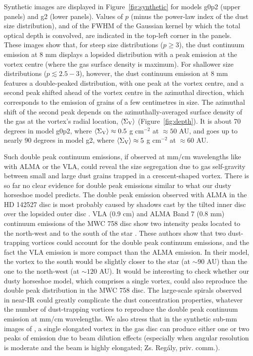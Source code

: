 \documentclass[a4paper,usenatbib]{mnras}
\begin{document}
Synthetic images are displayed in Figure~\ref{fig:synthetic} for
models g0p2 (upper panels) and g2 (lower panels). Values of $p$ (minus
the power-law index of the dust size distribution), and of the FWHM of
the Gaussian kernel by which the total optical depth is convolved, are
indicated in the top-left corner in the panels. These images show
that, for steep size distributions ($p \geq 3$), the dust continuum
emission at 8 mm displays a lopsided distribution with a peak emission
at the vortex centre (where the gas surface density is maximum). For
shallower size distributions ($p \lesssim 2.5-3$), however, the dust
continuum emission at 8 mm features a double-peaked distribution, with
one peak at the vortex centre, and a second peak shifted ahead of the
vortex centre in the azimuthal direction, which corresponds to the
emission of grains of a few centimetres in size.  The azimuthal shift
of the second peak depends on the azimuthally-averaged surface density
of the gas at the vortex's radial location, $\langle\Sigma_{\rm
  V}\rangle$ (Figure~\ref{fig:depth}). It is about 70 degrees in model
g0p2, where $\langle\Sigma_{\rm V}\rangle \approx 0.5$ g cm$^{-2}$ at
$\approx 50$ AU, and goes up to nearly 90 degrees in model g2, where
$\langle\Sigma_{\rm V}\rangle \approx 5$ g cm$^{-2}$ at $\approx 60$
AU.

Such double peak continuum emissions, if observed at mm/cm wavelengths
like with ALMA or the VLA, could reveal the size segregation due to
gas self-gravity between small and large dust grains trapped in a
crescent-shaped vortex. There is so far no clear evidence for double
peak emissions similar to what our dusty horseshoe model predicts. The
double peak emission observed with ALMA in the HD 142527 disc is most
probably caused by shadows cast by the tilted inner disc over the
lopsided outer disc \citep{Casassus15,Marino15shadows}. VLA (0.9 cm)
and ALMA Band 7 (0.8 mm) continuum emissions of the MWC 758 disc show
two intensity peaks located to the north-west and to the south of the
star \citep{Marino15MWC758}. These authors show that two dust-trapping
vortices could account for the double peak continuum emissions, and
the fact the VLA emission is more compact than the ALMA emission. In
their model, the vortex to the south would be slightly closer to the
star (at $\sim 90$ AU) than the one to the north-west (at $\sim 120$
AU). It would be interesting to check whether our dusty horseshoe
model, which comprises a single vortex, could also reproduce the
double peak distribution in the MWC 758 disc. The large-scale spirals
observed in near-IR \citep{Benisty15} could greatly complicate the
dust concentration properties, whatever the number of dust-trapping
vortices to reproduce the double peak continuum emission at mm/cm
wavelengths. We also stress that in the synthetic sub-mm images of
\cite{Regaly12}, a single elongated vortex in the gas disc can produce
either one or two peaks of emission due to beam dilution effects
(especially when angular resolution is moderate and the beam is highly
elongated; Zs. Reg{\'a}ly, priv. comm.).
\end{document}
